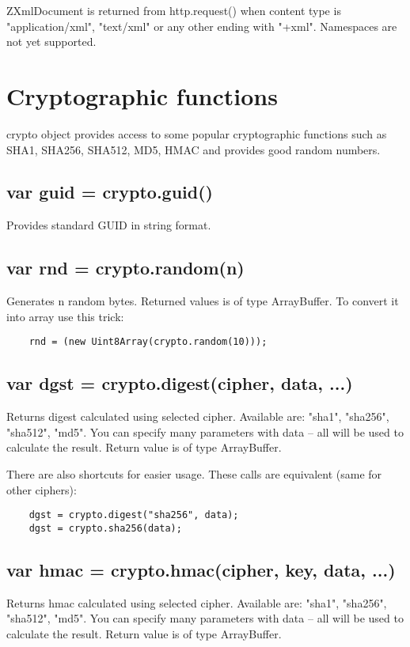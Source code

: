 ZXmlDocument is returned from http.request() when content type is "application/xml", "text/xml" or any other ending with "+xml". Namespaces are not yet supported.

\section{Cryptographic functions}

crypto object provides access to some popular cryptographic functions such
as SHA1, SHA256, SHA512, MD5, HMAC and provides good random numbers.

\subsection{var guid = crypto.guid()}
Provides standard GUID in string format.

\subsection{var rnd = crypto.random(n)}
Generates n random bytes.
Returned values is of type ArrayBuffer. To convert it into array use this
trick:
\begin{lstlisting}
	rnd = (new Uint8Array(crypto.random(10)));
\end{lstlisting}

\subsection{var dgst = crypto.digest(cipher, data, ...)}
Returns digest calculated using selected cipher. Available are: "sha1", "sha256", "sha512", "md5".
You can specify many parameters with data -- all will be used to calculate the result.
Return value is of type ArrayBuffer.

There are also shortcuts for easier usage. These calls are equivalent (same
for other ciphers):

\begin{lstlisting}
	dgst = crypto.digest("sha256", data);
	dgst = crypto.sha256(data);
\end{lstlisting}

\subsection{var hmac = crypto.hmac(cipher, key, data, ...)}
Returns hmac calculated using selected cipher. Available are: "sha1", "sha256", "sha512", "md5".
You can specify many parameters with data -- all will be used to calculate the result.
Return value is of type ArrayBuffer.

